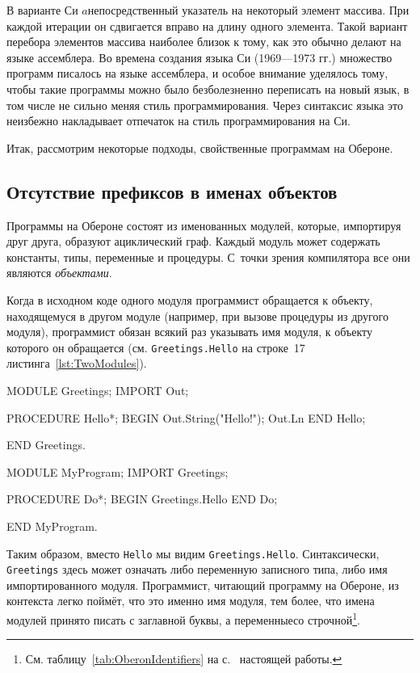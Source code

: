 \documentclass[utf8]{lgu}
\newcommand{\tire}{\unskip\nobreak\thinspace\textemdash\thinspace}
\newcommand{\code}[1]{{\normalsize\texttt{#1}}}
\begin{document}
В варианте Си $a$\tire непосредственный указатель на некоторый элемент массива. При каждой итерации он сдвигается вправо на длину одного элемента. Такой вариант перебора элементов массива наиболее близок к тому, как это обычно делают на языке ассемблера. Во времена создания языка Си (1969---1973 гг.) множество программ писалось на языке ассемблера, и особое внимание уделялось тому, чтобы такие программы можно было безболезненно переписать на новый язык, в том числе не сильно меняя стиль программирования. Через синтаксис языка это неизбежно накладывает отпечаток на стиль программирования на Си.

Итак, рассмотрим некоторые подходы, свойственные программам на Обероне.

\subsection{Отсутствие префиксов в именах объектов}

\firstparskip Программы на Обероне состоят из именованных модулей, которые, импортируя друг друга, образуют ациклический граф. Каждый модуль может содержать константы, типы, переменные и процедуры. С~точки зрения компилятора все они являются \textit{объектами}.

Когда в исходном коде одного модуля программист обращается к объекту, находящемуся в другом модуле (например, при вызове процедуры из другого модуля), программист обязан всякий раз указывать имя модуля, к объекту которого он обращается (см. \code{Greetings.Hello} на строке~17 листинга~\ref{lst:TwoModules}).

\begin{listing}[H]
\caption{Обращение к объектам импортированного модуля}
\vspace{-17pt}
\label{lst:TwoModules}
\begin{modula2}
MODULE Greetings;
  IMPORT Out;

  PROCEDURE Hello*;
  BEGIN
    Out.String("Hello!");
    Out.Ln
  END Hello;

END Greetings.

MODULE MyProgram;
  IMPORT Greetings;

  PROCEDURE Do*;
  BEGIN
    Greetings.Hello
  END Do;

END MyProgram.
\end{modula2}
\end{listing}

Таким образом, вместо \code{Hello} мы видим \code{Greetings.Hello}. Синтаксически, \code{Greetings} здесь может означать либо переменную записного типа, либо имя импортированного модуля. Программист, читающий программу на Обероне, из контекста легко поймёт, что это именно имя модуля, тем более, что имена модулей принято писать с заглавной буквы, а переменные\tire со строчной\footnote{См. таблицу~\ref{tab:OberonIdentifiers} на с.~\pageref{tab:OberonIdentifiers} настоящей работы.}.
\end{document}
